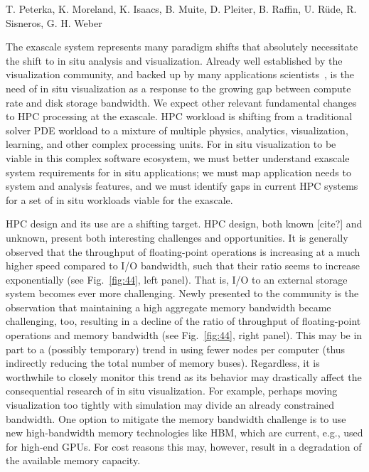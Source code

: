 
\license

 T. Peterka, K. Moreland, K. Isaacs, B. Muite, D. Pleiter, B. Raffin, U.  Rüde, R. Sisneros, G. H. Weber

\begin{refsection}

The exascale system represents many paradigm shifts that absolutely necessitate the shift to in situ analysis and visualization. Already well established by the visualization community, and backed up by many applications scientists~\cite{Gerber18}, is the need of in situ visualization as a response to the growing gap between compute rate and disk storage bandwidth.
We expect other relevant fundamental changes to HPC processing at the exascale. HPC workload is shifting from a traditional solver PDE workload to a mixture of multiple physics, analytics, visualization, learning, and other complex processing units. For in situ visualization to be viable in this complex software ecosystem, we must better understand exascale system requirements for in situ applications; we must map application needs to system and analysis features, and we must identify gaps in current HPC systems for a set of in situ workloads viable for the exascale.

HPC design and its use are a shifting target. HPC design, both known [cite?] and unknown, present both interesting challenges and opportunities.
It is generally observed that the throughput of floating-point operations is increasing at a much higher speed compared to I/O bandwidth, such that their ratio seems to increase exponentially (see Fig.~\ref{fig:44}, left panel). That is, I/O to an external storage system becomes ever more challenging. Newly presented to the community is the observation that maintaining a high aggregate memory bandwidth became challenging, too, resulting in a decline of the ratio of throughput of floating-point operations and memory bandwidth (see Fig.~\ref{fig:44}, right panel). This may be in part to a (possibly temporary) trend in using fewer nodes per computer (thus indirectly reducing the total number of memory buses). Regardless, it is worthwhile to closely monitor this trend as its behavior may drastically affect the consequential research of in situ visualization. For example, perhaps moving visualization too tightly with simulation may divide an already constrained bandwidth. One option to mitigate the memory bandwidth challenge is to use new high-bandwidth memory technologies like HBM, which are current, e.g., used for high-end GPUs. For cost reasons this may, however, result in a degradation of the available memory capacity.


\end{refsection}
